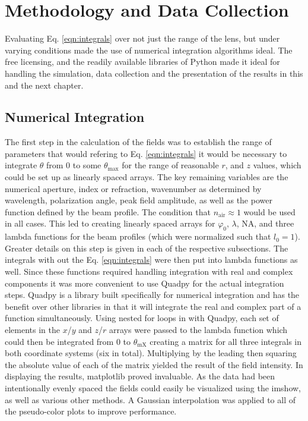 \documentclass[12pt,a4paper]{article}
\begin{document}
\section{Methodology and Data Collection}
Evaluating Eq. \ref{eqn:integrals} over not just the range of the lens, but under varying conditions made the use of numerical integration algorithms ideal. The free licensing, and the readily available libraries of Python made it ideal for handling the simulation, data collection and the presentation of the results in this and the next chapter.

\subsection{Numerical Integration}
The first step in the calculation of the fields was to establish the range of parameters that would refering to Eq. \ref{eqn:integrals} it would be necessary to integrate $\theta$ from 0 to some $\theta_\text{max}$ for the range of reasonable $r$, and $z$ values, which could be set up as linearly spaced arrays. The key remaining variables are the numerical aperture, index or refraction, wavenumber as determined by wavelength, polarization angle, peak field amplitude, as well as the power function defined by the beam profile. The condition that $n_\text{air} \approx 1$ would be used in all cases. This led to creating linearly spaced arrays for $\varphi_0$, $\lambda$, NA, and three lambda functions for the beam profiles (which were normalized such that $l_0=1$). Greater details on this step is given in each of the respective subsections. The integrals with out the Eq. \ref{eqn:integrals} were then put into lambda functions as well. Since these functions required handling integration with real and complex components it was more convenient to use Quadpy for the actual integration steps. Quadpy is a library built specifically for numerical integration and has the benefit over other libraries in that it will integrate the real and complex part of a function simultaneously. Using nested for loops in with Quadpy, each set of elements in the $x$/$y$ and $z$/$r$ arrays were passed to the lambda function which could then be integrated from 0 to $\theta_\text{mX}$ creating a matrix for all three integrals in both coordinate systems (six in total). Multiplying by the leading then squaring the absolute value of each of the matrix yielded the result of the field intensity. In displaying the results, matplotlib proved invaluable. As the data had been intentionally evenly spaced the fields could easily be visualized using the imshow, as well as various other methods. A Gaussian interpolation was applied to all of the pseudo-color plots to improve performance.
\end{document}
